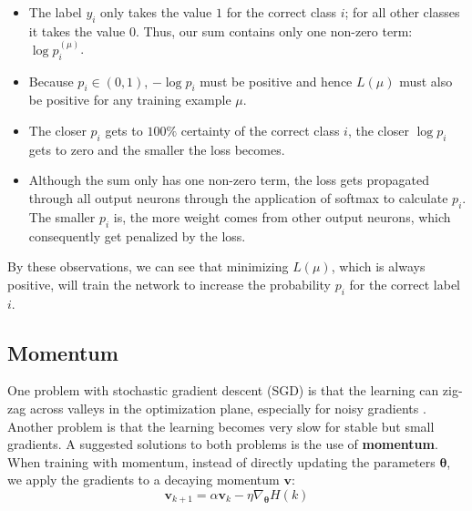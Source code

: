 \begin{itemize}
    \item The label $y_i$ only takes the value $1$ for the correct class $i$; for all other classes it takes the value $0$. Thus, our sum contains only one non-zero term: $\log p_i^{(\mu)}$.
    \item Because $p_i \in (0, 1)$, $- \log p_i$ must be positive and hence $L(\mu)$ must also be positive for any training example $\mu$.
    \item The closer $p_i$ gets to $100\%$ certainty of the correct class $i$, the closer $\log p_i$ gets to zero and the smaller the loss becomes.
    \item Although the sum only has one non-zero term, the loss gets propagated through all output neurons through the application of softmax to calculate $p_i$. The smaller $p_i$ is, the more weight comes from other output neurons, which consequently get penalized by the loss.
\end{itemize}


By these observations, we can see that minimizing $L(\mu)$, which is always positive, will train the network to increase the probability $p_i$ for the correct label $i$.

\subsection{Momentum}

One problem with stochastic gradient descent (SGD) is that the learning can zig-zag across valleys in the optimization plane, especially for noisy gradients \cite[Chapter~8]{GoodfellowBook}. Another problem is that the learning becomes very slow for stable but small gradients. A suggested solutions to both problems is the use of \textbf{momentum}. When training with momentum, instead of directly updating the parameters $\mathbf{\theta}$, we apply the gradients to a decaying momentum $\mathbf{v}$:
\[
\mathbf{v}_{k+1} = \alpha \mathbf{v}_k - \eta \nabla_{\mathbf{\theta}} H(k)
\]

